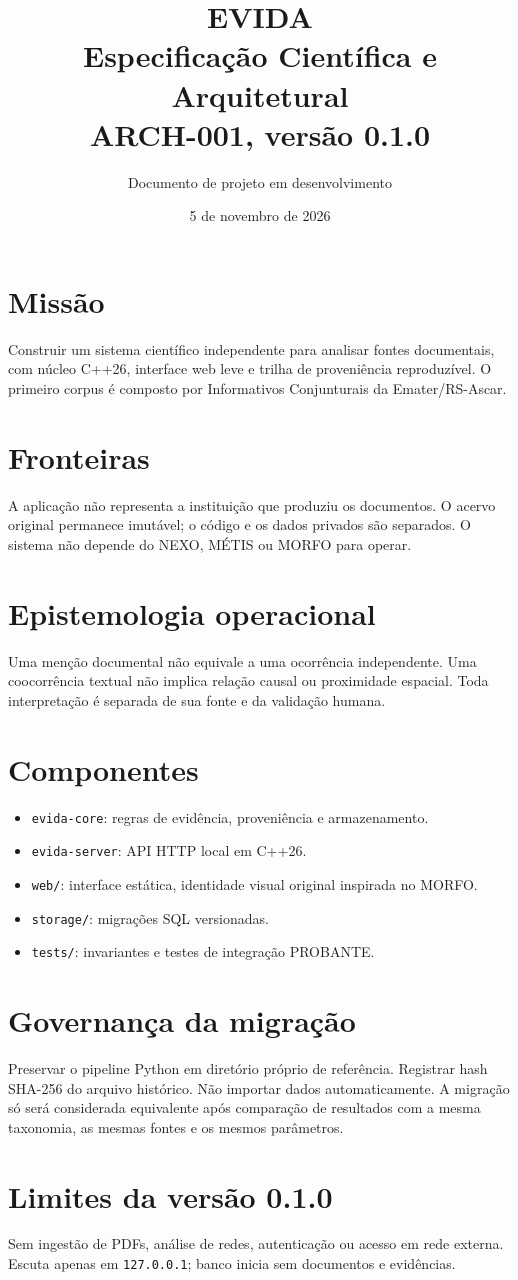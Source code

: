 \documentclass[11pt,a4paper]{article}
\title{EVIDA\\Especificação Científica e Arquitetural\\\large ARCH-001, versão 0.1.0}
\author{Documento de projeto em desenvolvimento}
\date{5 de novembro de 2026}
\begin{document}
\maketitle
\section{Missão}
Construir um sistema científico independente para analisar fontes documentais,
com núcleo C++26, interface web leve e trilha de proveniência reproduzível.
O primeiro corpus é composto por Informativos Conjunturais da Emater/RS-Ascar.
\section{Fronteiras}
A aplicação não representa a instituição que produziu os documentos.
O acervo original permanece imutável; o código e os dados privados são separados.
O sistema não depende do NEXO, MÉTIS ou MORFO para operar.
\section{Epistemologia operacional}
Uma menção documental não equivale a uma ocorrência independente.
Uma coocorrência textual não implica relação causal ou proximidade espacial.
Toda interpretação é separada de sua fonte e da validação humana.
\section{Componentes}
\begin{itemize}
\item \texttt{evida-core}: regras de evidência, proveniência e armazenamento.
\item \texttt{evida-server}: API HTTP local em C++26.
\item \texttt{web/}: interface estática, identidade visual original inspirada no MORFO.
\item \texttt{storage/}: migrações SQL versionadas.
\item \texttt{tests/}: invariantes e testes de integração PROBANTE.
\end{itemize}
\section{Governança da migração}
Preservar o pipeline Python em diretório próprio de referência. Registrar
hash SHA-256 do arquivo histórico. Não importar dados automaticamente. A
migração só será considerada equivalente após comparação de resultados
com a mesma taxonomia, as mesmas fontes e os mesmos parâmetros.
\section{Limites da versão 0.1.0}
Sem ingestão de PDFs, análise de redes, autenticação ou acesso em rede externa.
Escuta apenas em \texttt{127.0.0.1}; banco inicia sem documentos e evidências.
\end{document}
